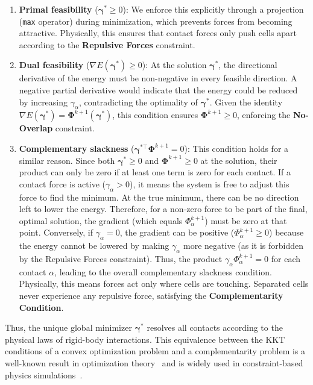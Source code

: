 \documentclass[conference]{IEEEtran}
\begin{document}
\begin{enumerate}
    \item \textbf{Primal feasibility} ($\boldsymbol{\gamma}^* \geq 0$): We enforce this explicitly through a projection (\texttt{max} operator) during minimization, which prevents forces from becoming attractive. Physically, this ensures that contact forces only push cells apart according to the \textbf{Repulsive Forces} constraint.

    \item \textbf{Dual feasibility} ($\nabla E(\boldsymbol{\gamma}^*) \geq 0$): At the solution $\boldsymbol{\gamma}^*$, the directional derivative of the energy must be non-negative in every feasible direction. A negative partial derivative would indicate that the energy could be reduced by increasing $\gamma_\alpha$, contradicting the optimality of $\boldsymbol{\gamma}^*$. Given the identity $\nabla E(\boldsymbol{\gamma}^*) = \boldsymbol{\Phi}^{k+1}(\boldsymbol{\gamma}^*)$, this condition ensures $\boldsymbol{\Phi}^{k+1} \geq 0$, enforcing the \textbf{No-Overlap} constraint.

    \item \textbf{Complementary slackness} ($\boldsymbol{\gamma}^{*\top} \boldsymbol{\Phi}^{k+1} = 0$): This condition holds for a similar reason. Since both $\boldsymbol{\gamma}^* \geq 0$ and $\boldsymbol{\Phi}^{k+1} \geq 0$ at the solution, their product can only be zero if at least one term is zero for each contact. If a contact force is active ($\gamma_\alpha > 0$), it means the system is free to adjust this force to find the minimum. At the true minimum, there can be no direction left to lower the energy. Therefore, for a non-zero force to be part of the final, optimal solution, the gradient (which equals $\Phi^{k+1}_\alpha$) must be zero at that point. Conversely, if $\gamma_\alpha = 0$, the gradient can be positive ($\Phi^{k+1}_\alpha \geq 0$) because the energy cannot be lowered by making $\gamma_\alpha$ more negative (as it is forbidden by the Repulsive Forces constraint). Thus, the product $\gamma_\alpha \Phi^{k+1}_\alpha = 0$ for each contact $\alpha$, leading to the overall complementary slackness condition. Physically, this means forces act only where cells are touching. Separated cells never experience any repulsive force, satisfying the \textbf{Complementarity Condition}.
\end{enumerate}

Thus, the unique global minimizer $\boldsymbol{\gamma}^*$ resolves all contacts according to the physical laws of rigid-body interactions. This equivalence between the KKT conditions of a convex optimization problem and a complementarity problem is a well-known result in optimization theory~\cite{Nocedal2006} and is widely used in constraint-based physics simulations~\cite{Yan2022,Tasora2008, Yan2019, Li2021, Weady2024SM,Rudge2012,Macklin2014,Ferguson2021,CellModellerMaths}.
\end{document}

